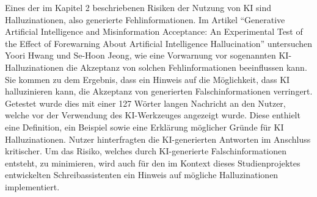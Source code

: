 \documentclass[../main.tex]{subfiles}
\begin{document}
Eines der im Kapitel 2 beschriebenen Risiken der Nutzung von KI sind Halluzinationen, also generierte Fehlinformationen. Im Artikel "`Generative Artificial Intelligence 
and Misinformation Acceptance: An Experimental Test of the Effect of Forewarning About Artificial Intelligence Hallucination"' untersuchen Yoori Hwang und Se-Hoon Jeong, 
wie eine Vorwarnung vor sogenannten KI-Halluzinationen die Akzeptanz von solchen Fehlinformationen beeinflussen kann. Sie kommen zu dem Ergebnis, dass ein Hinweis auf 
die Möglichkeit, dass KI halluzinieren kann, die Akzeptanz von generierten Falschinformationen verringert. Getestet wurde dies mit einer 127 Wörter langen Nachricht an 
den Nutzer, welche vor der Verwendung des KI-Werkzeuges angezeigt wurde. Diese enthielt eine Definition, ein Beispiel sowie eine Erklärung möglicher Gründe für KI 
Halluzinationen\cite[285]{hallucinationForewarning}. Nutzer hinterfragten die KI-generierten Antworten im Anschluss kritischer. Um das Risiko, welches durch KI-generierte Falschinformationen 
entsteht, zu minimieren, wird auch für den im Kontext dieses Studienprojektes entwickelten Schreibassistenten ein Hinweis auf mögliche Halluzinationen implementiert.\cite{hallucinationForewarning}
\end{document}
